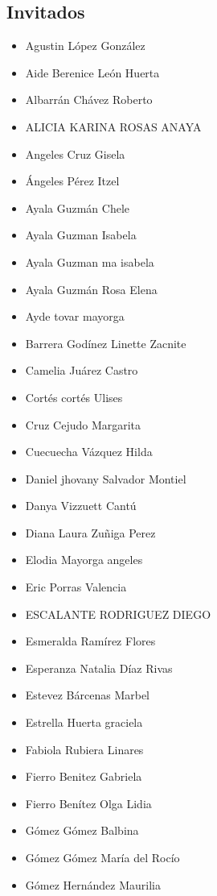 \begin{spacing}{0.5}
\section*{Invitados}
\begin{paracol}{2}
\begin{itemize}
\item Agustin López González
\item Aide Berenice León Huerta
\item Albarrán Chávez Roberto
\item ALICIA KARINA ROSAS ANAYA
\item Angeles Cruz Gisela
\item Ángeles Pérez Itzel
\item Ayala Guzmán Chele
\item Ayala Guzman Isabela
\item Ayala Guzman ma isabela
\item Ayala Guzmán Rosa Elena
\item Ayde tovar mayorga
\item Barrera Godínez Linette Zacnite
\item Camelia Juárez Castro
\item Cortés cortés Ulises
\item Cruz Cejudo Margarita
\item Cuecuecha Vázquez Hilda
\item Daniel jhovany Salvador Montiel
\item Danya Vizzuett Cantú
\item Diana Laura Zuñiga Perez
\item Elodia Mayorga angeles
\end{itemize}
\switchcolumn
\begin{itemize}
\item Eric Porras Valencia
\item ESCALANTE RODRIGUEZ DIEGO
\item Esmeralda Ramírez Flores
\item Esperanza Natalia Díaz Rivas
\item Estevez Bárcenas Marbel
\item Estrella Huerta graciela
\item Fabiola Rubiera Linares
\item Fierro Benitez Gabriela
\item Fierro Benítez Olga Lidia
\item Gómez Gómez Balbina
\item Gómez Gómez María del Rocío
\item Gómez Hernández Maurilia

\end{itemize}
\end{paracol}
\end{spacing}
